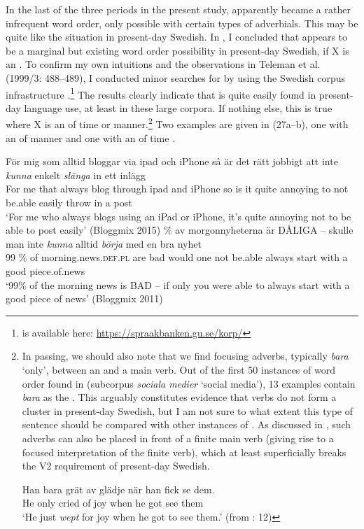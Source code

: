 \documentclass[output=paper, colorlinks, citecolor=brown]{langscibook}
\begin{document}
In the last of the three  periods in the present study,  apparently became a rather infrequent word order, only possible with certain types of adverbials. This may be quite like the situation in present-day Swedish. In , I concluded that  appears to be a marginal but existing word order possibility in present-day Swedish, if X is an . To confirm my own intuitions and the observations in Teleman et al. (1999/3: 488–489), I conducted minor searches for  by using the Swedish corpus infrastructure  \citep{BorinEtAl2012}.\footnote{ is available here: \url{https://spraakbanken.gu.se/korp/}}  The results clearly indicate that  is quite easily found in present-day language use, at least in these large corpora. If nothing else, this is true where X is an  of time or manner.{\footnote{In passing, we should also note that we find focusing adverbs, typically \textit{bara} ‘only’, between an  and a main verb. Out of the first 50 instances of  word order found in  (subcorpus \textit{sociala medier} ‘social media’), 13 examples contain \textit{bara} as the . This arguably constitutes evidence that verbs do not form a cluster in present-day Swedish, but I am not sure to what extent this type of sentence should be compared with other instances of . As discussed in \citet{BrandtlerHakansson2017}, such adverbs can also be placed in front of a finite main verb (giving rise to a focused interpretation of the finite verb), which at least superficially breaks the V2 requirement of present-day Swedish.   

\ea
\gll  Han  bara  grät  av  glädje  när  han  fick  se  dem.\\
      He  only  cried  of  joy  when  he  got  see  them\\
\glt ‘He just \textit{wept} for joy when he got to see them.’ (from \citealt{BrandtlerHakansson2017}: 12)
\z}} Two examples are given in (27a–b), one with an  of manner  and one with an  of time .


\ea {}\label{ex:sangfelt:27}
\ea\label{ex:sangfelt:27a}
\gll För mig som alltid bloggar via ipad och iPhone så är det rätt jobbigt att inte \textit{kunna} {enkelt} \textit{slänga} in ett inlägg\\
 For me that always blog through ipad and iPhone so is it quite annoying to not be.able easily throw in a post\\
\glt ‘For me who always blogs using an iPad or iPhone, it’s quite annoying not to be able to post easily’ (Bloggmix 2015)
\ex \label{ex:sangfelt:27b} \% av morgonnyheterna är DÅLIGA – skulle man inte \textit{kunna} {alltid} \textit{börja} med en bra nyhet \\
99 \% of morning.news.\textsc{def.pl} are bad {} would one not be.able always start with a good piece.of.news \\
\glt ‘99\% of the morning news is BAD – if only you were able to always start with a good piece of news’ (Bloggmix 2011)\\
\z 
\z 
\end{document}
